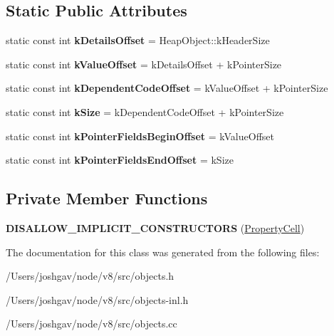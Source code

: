 \subsection*{Static Public Attributes}
\begin{DoxyCompactItemize}
\item 
static const int {\bfseries k\+Details\+Offset} = Heap\+Object\+::k\+Header\+Size\hypertarget{classv8_1_1internal_1_1_property_cell_a9eca2ab1acc9e7d269c42234bd6f0ae9}{}\label{classv8_1_1internal_1_1_property_cell_a9eca2ab1acc9e7d269c42234bd6f0ae9}

\item 
static const int {\bfseries k\+Value\+Offset} = k\+Details\+Offset + k\+Pointer\+Size\hypertarget{classv8_1_1internal_1_1_property_cell_a35f0fea4789352fe9b971e8486d6034d}{}\label{classv8_1_1internal_1_1_property_cell_a35f0fea4789352fe9b971e8486d6034d}

\item 
static const int {\bfseries k\+Dependent\+Code\+Offset} = k\+Value\+Offset + k\+Pointer\+Size\hypertarget{classv8_1_1internal_1_1_property_cell_a4170212f9537f0386e47d0cb3992862d}{}\label{classv8_1_1internal_1_1_property_cell_a4170212f9537f0386e47d0cb3992862d}

\item 
static const int {\bfseries k\+Size} = k\+Dependent\+Code\+Offset + k\+Pointer\+Size\hypertarget{classv8_1_1internal_1_1_property_cell_aebba1cc2196a61c1f8e639175a9a83d5}{}\label{classv8_1_1internal_1_1_property_cell_aebba1cc2196a61c1f8e639175a9a83d5}

\item 
static const int {\bfseries k\+Pointer\+Fields\+Begin\+Offset} = k\+Value\+Offset\hypertarget{classv8_1_1internal_1_1_property_cell_a2124652b9ed706cca12d0ea32d3f9ec9}{}\label{classv8_1_1internal_1_1_property_cell_a2124652b9ed706cca12d0ea32d3f9ec9}

\item 
static const int {\bfseries k\+Pointer\+Fields\+End\+Offset} = k\+Size\hypertarget{classv8_1_1internal_1_1_property_cell_ab94bf9324dfa02d1ac67aac334083c20}{}\label{classv8_1_1internal_1_1_property_cell_ab94bf9324dfa02d1ac67aac334083c20}

\end{DoxyCompactItemize}
\subsection*{Private Member Functions}
\begin{DoxyCompactItemize}
\item 
{\bfseries D\+I\+S\+A\+L\+L\+O\+W\+\_\+\+I\+M\+P\+L\+I\+C\+I\+T\+\_\+\+C\+O\+N\+S\+T\+R\+U\+C\+T\+O\+RS} (\hyperlink{classv8_1_1internal_1_1_property_cell}{Property\+Cell})\hypertarget{classv8_1_1internal_1_1_property_cell_ac27122586065fd59a484ba646b3dc771}{}\label{classv8_1_1internal_1_1_property_cell_ac27122586065fd59a484ba646b3dc771}

\end{DoxyCompactItemize}


The documentation for this class was generated from the following files\+:\begin{DoxyCompactItemize}
\item 
/\+Users/joshgav/node/v8/src/objects.\+h\item 
/\+Users/joshgav/node/v8/src/objects-\/inl.\+h\item 
/\+Users/joshgav/node/v8/src/objects.\+cc\end{DoxyCompactItemize}
